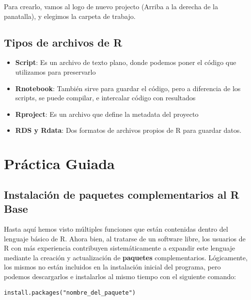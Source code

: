 \documentclass[]{book}
\providecommand{\tightlist}{%
  \setlength{\itemsep}{0pt}\setlength{\parskip}{0pt}}
\begin{document}
Para crearlo, vamos al logo de nuevo projecto (Arriba a la derecha de la panatalla), y elegimos la carpeta de trabajo.

\hypertarget{tipos-de-archivos-de-r}{%
\subsection{Tipos de archivos de R}\label{tipos-de-archivos-de-r}}

\begin{itemize}
\tightlist
\item
  \textbf{Script}: Es un archivo de texto plano, donde podemos poner el código que utilizamos para preservarlo
\item
  \textbf{Rnotebook}: También sirve para guardar el código, pero a diferencia de los scripts, se puede compilar, e intercalar código con resultados
\item
  \textbf{Rproject}: Es un archivo que define la metadata del proyecto
\item
  \textbf{RDS y Rdata}: Dos formatos de archivos propios de R para guardar datos.
\end{itemize}

\hypertarget{practica-guiada}{%
\section{Práctica Guiada}\label{practica-guiada}}

\hypertarget{instalacion-de-paquetes-complementarios-al-r-base}{%
\subsection{Instalación de paquetes complementarios al R Base}\label{instalacion-de-paquetes-complementarios-al-r-base}}

Hasta aquí hemos visto múltiples funciones que están contenidas dentro del lenguaje básico de R. Ahora bien, al tratarse de un software libre, los usuarios de R con más experiencia contribuyen sistemáticamente a expandir este lenguaje mediante la creación y actualización de \textbf{paquetes} complementarios. Lógicamente, los mismos no están incluidos en la instalación inicial del programa, pero podemos descargarlos e instalarlos al mismo tiempo con el siguiente comando:

\begin{verbatim}
install.packages("nombre_del_paquete") 
\end{verbatim}
\end{document}
